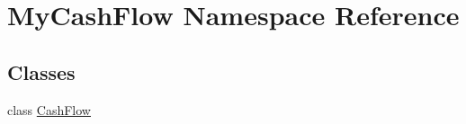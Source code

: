 \hypertarget{namespaceMyCashFlow}{}\section{My\+Cash\+Flow Namespace Reference}
\label{namespaceMyCashFlow}
\subsection*{Classes}
\begin{DoxyCompactItemize}
\item 
class \hyperlink{classMyCashFlow_1_1CashFlow}{Cash\+Flow}
\end{DoxyCompactItemize}
